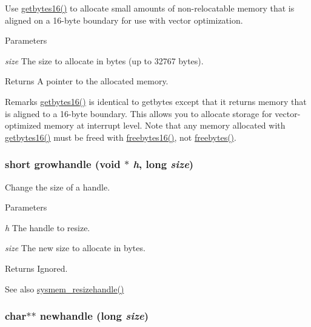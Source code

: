 Use \hyperlink{group__memory_ga198147e2629edde67218d8a759e9d5a0}{getbytes16()} to allocate small amounts of non-\/relocatable memory that is aligned on a 16-\/byte boundary for use with vector optimization. 
\begin{DoxyParams}{Parameters}
\item[{\em size}]The size to allocate in bytes (up to 32767 bytes). \end{DoxyParams}
\begin{DoxyReturn}{Returns}
A pointer to the allocated memory.
\end{DoxyReturn}
\begin{DoxyRemark}{Remarks}
\hyperlink{group__memory_ga198147e2629edde67218d8a759e9d5a0}{getbytes16()} is identical to getbytes except that it returns memory that is aligned to a 16-\/byte boundary. This allows you to allocate storage for vector-\/optimized memory at interrupt level. Note that any memory allocated with \hyperlink{group__memory_ga198147e2629edde67218d8a759e9d5a0}{getbytes16()} must be freed with \hyperlink{group__memory_gafba42d2b23405e29469392394cf41555}{freebytes16()}, not \hyperlink{group__memory_gaa1dc485c42515917ca377dbaf15b7dcd}{freebytes()}. 
\end{DoxyRemark}
\hypertarget{group__memory_ga6402eb4bbf3acd03d3e2f1133195bac3}{
\subsubsection[{growhandle}]{\setlength{\rightskip}{0pt plus 5cm}short growhandle (void $\ast$ {\em h}, \/  long {\em size})}}
\label{group__memory_ga6402eb4bbf3acd03d3e2f1133195bac3}


Change the size of a handle. 
\begin{DoxyParams}{Parameters}
\item[{\em h}]The handle to resize. \item[{\em size}]The new size to allocate in bytes. \end{DoxyParams}
\begin{DoxyReturn}{Returns}
Ignored. 
\end{DoxyReturn}
\begin{DoxySeeAlso}{See also}
\hyperlink{group__memory_ga420520dda6015ec33876b18b860083dd}{sysmem\_\-resizehandle()} 
\end{DoxySeeAlso}
\hypertarget{group__memory_ga50135e5f9bb18030ff1d12e9976253ab}{
\subsubsection[{newhandle}]{\setlength{\rightskip}{0pt plus 5cm}char$\ast$$\ast$ newhandle (long {\em size})}}
\label{group__memory_ga50135e5f9bb18030ff1d12e9976253ab}


